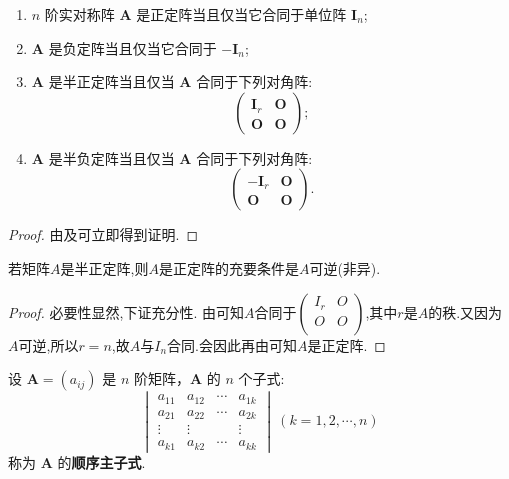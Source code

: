 \documentclass[../../main.tex]{subfiles}%
\begin{document}
\begin{theorem}[(半)正定/负定阵的合同标准型]\label{theorem:正定矩阵的充要条件}
\begin{enumerate}[(1)]
\item $n$ 阶实对称阵 $\boldsymbol{A}$ 是正定阵当且仅当它合同于单位阵 $\boldsymbol{I}_n$;

\item $\boldsymbol{A}$ 是负定阵当且仅当它合同于 $-\boldsymbol{I}_n$;

\item $\boldsymbol{A}$ 是半正定阵当且仅当 $\boldsymbol{A}$ 合同于下列对角阵:
\[
\begin{pmatrix}
\boldsymbol{I}_r & \boldsymbol{O}\\
\boldsymbol{O} & \boldsymbol{O}
\end{pmatrix};
\]

\item $\boldsymbol{A}$ 是半负定阵当且仅当 $\boldsymbol{A}$ 合同于下列对角阵:
\[
\begin{pmatrix}
-\boldsymbol{I}_r & \boldsymbol{O}\\
\boldsymbol{O} & \boldsymbol{O}
\end{pmatrix}.
\] 
\end{enumerate}
\end{theorem}
\begin{proof}
由及可立即得到证明.
\end{proof}

\begin{corollary}\label{corollary:可逆的半正定阵必是正定阵}
若矩阵$A$是半正定阵,则$A$是正定阵的充要条件是$A$可逆(非异).
\end{corollary}
\begin{proof}
必要性显然,下证充分性.
由可知$A$合同于$\left( \begin{matrix}
I_r&		O\\
O&		O\\
\end{matrix} \right) $,其中$r$是$A$的秩.又因为$A$可逆,所以$r=n$,故$A$与$I_n$合同.会因此再由可知$A$是正定阵.
\end{proof}

\begin{definition}[顺序主子式]
设 $\boldsymbol{A}=(a_{ij})$ 是 $n$ 阶矩阵，$\boldsymbol{A}$ 的 $n$ 个子式:
\[
\begin{vmatrix}
a_{11} & a_{12} & \cdots & a_{1k}\\
a_{21} & a_{22} & \cdots & a_{2k}\\
\vdots & \vdots & & \vdots\\
a_{k1} & a_{k2} & \cdots & a_{kk}
\end{vmatrix}\ (k = 1,2,\cdots,n)
\]
称为 $\boldsymbol{A}$ 的\textbf{顺序主子式}.
\end{definition}
\end{document}
